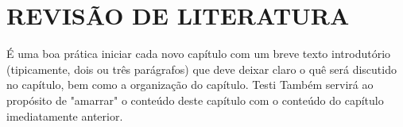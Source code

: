 
\chapter{REVISÃO DE LITERATURA}
\label{chap:fundamentacaoTeorica}

É uma boa prática iniciar cada novo capítulo com um breve texto introdutório (tipicamente, dois ou três parágrafos) que deve deixar claro o quê será discutido no capítulo, bem como a organização do capítulo.
Testi
Também servirá ao propósito de "amarrar"{} o conteúdo deste capítulo com o conteúdo do capítulo imediatamente anterior.

